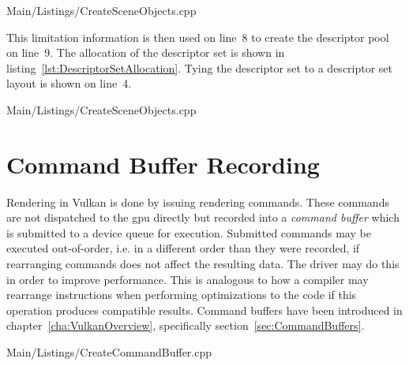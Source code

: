      
      {Main/Listings/CreateSceneObjects.cpp}

      This limitation information is then used on line~8 to create the descriptor pool on line~9.
      The allocation of the descriptor set is shown in listing~\ref{lst:DescriptorSetAllocation}.
      Tying the descriptor set to a descriptor set layout is shown on line~4.

      
      {Main/Listings/CreateSceneObjects.cpp}



  \section{Command Buffer Recording}
  \label{sec:BuildCommandBuffers}
    Rendering in Vulkan is done by issuing rendering commands.
    These commands are not dispatched to the \gls{gpu} directly but recorded into a \textit{command buffer} which is submitted to a device queue for execution.
    Submitted commands may be executed out-of-order, i.e. in a different order than they were recorded, if rearranging commands does not affect the resulting data.
    The \gls{driver} may do this in order to improve performance.
    This is analogous to how a compiler may rearrange instructions when performing optimizations to the code if this operation produces compatible results.
    Command buffers have been introduced in chapter~\ref{cha:VulkanOverview}, specifically section~\ref{sec:CommandBuffers}.

    
    {Main/Listings/CreateCommandBuffer.cpp}

